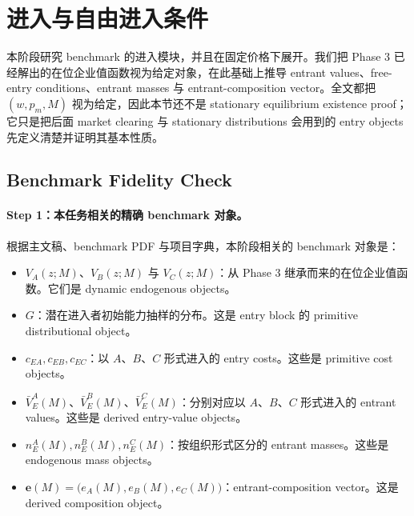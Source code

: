 \section{进入与自由进入条件}

本阶段研究 benchmark 的进入模块，并且在固定价格下展开。我们把 Phase 3 已经解出的在位企业值函数视为给定对象，在此基础上推导 entrant values、free-entry conditions、entrant masses 与 entrant-composition vector。全文都把 $(w,p_m,M)$ 视为给定，因此本节还不是 stationary equilibrium existence proof；它只是把后面 market clearing 与 stationary distributions 会用到的 entry objects 先定义清楚并证明其基本性质。

\subsection{Benchmark Fidelity Check}

\paragraph{Step 1：本任务相关的精确 benchmark 对象。}
根据主文稿、benchmark PDF 与项目字典，本阶段相关的 benchmark 对象是：
\begin{itemize}
    \item $V_A(z;M)$、$V_B(z;M)$ 与 $V_C(z;M)$：从 Phase 3 继承而来的在位企业值函数。它们是 dynamic endogenous objects。
    \item $G$：潜在进入者初始能力抽样的分布。这是 entry block 的 primitive distributional object。
    \item $c_{EA},c_{EB},c_{EC}$：以 $A$、$B$、$C$ 形式进入的 entry costs。这些是 primitive cost objects。
    \item $\bar V_E^A(M)$、$\bar V_E^B(M)$、$\bar V_E^C(M)$：分别对应以 $A$、$B$、$C$ 形式进入的 entrant values。这些是 derived entry-value objects。
    \item $n_E^A(M),n_E^B(M),n_E^C(M)$：按组织形式区分的 entrant masses。这些是 endogenous mass objects。
    \item $\mathbf e(M)=\bigl(e_A(M),e_B(M),e_C(M)\bigr)$：entrant-composition vector。这是 derived composition object。
\end{itemize}

